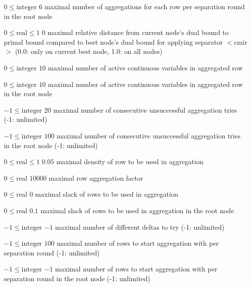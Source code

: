 %
{$0\leq\textrm{integer}$}%
{$6$}%
{maximal number of aggregations for each row per separation round in the root node}%
{}

%
{$0\leq\textrm{real}\leq1$}%
{$0$}%
{maximal relative distance from current node's dual bound to primal bound compared to best node's dual bound for applying separator $<$cmir$>$ (0.0: only on current best node, 1.0: on all nodes)}%
{}

%
{$0\leq\textrm{integer}$}%
{$10$}%
{maximal number of active continuous variables in aggregated row}%
{}

%
{$0\leq\textrm{integer}$}%
{$10$}%
{maximal number of active continuous variables in aggregated row in the root node}%
{}

%
{$-1\leq\textrm{integer}$}%
{$20$}%
{maximal number of consecutive unsuccessful aggregation tries (-1: unlimited)}%
{}

%
{$-1\leq\textrm{integer}$}%
{$100$}%
{maximal number of consecutive unsuccessful aggregation tries in the root node (-1: unlimited)}%
{}

%
{$0\leq\textrm{real}\leq1$}%
{$0.05$}%
{maximal density of row to be used in aggregation}%
{}

%
{$0\leq\textrm{real}$}%
{$10000$}%
{maximal row aggregation factor}%
{}

%
{$0\leq\textrm{real}$}%
{$0$}%
{maximal slack of rows to be used in aggregation}%
{}

%
{$0\leq\textrm{real}$}%
{$0.1$}%
{maximal slack of rows to be used in aggregation in the root node}%
{}

%
{$-1\leq\textrm{integer}$}%
{$-1$}%
{maximal number of different deltas to try (-1: unlimited)}%
{}

%
{$-1\leq\textrm{integer}$}%
{$100$}%
{maximal number of rows to start aggregation with per separation round (-1: unlimited)}%
{}

%
{$-1\leq\textrm{integer}$}%
{$-1$}%
{maximal number of rows to start aggregation with per separation round in the root node (-1: unlimited)}%
{}

